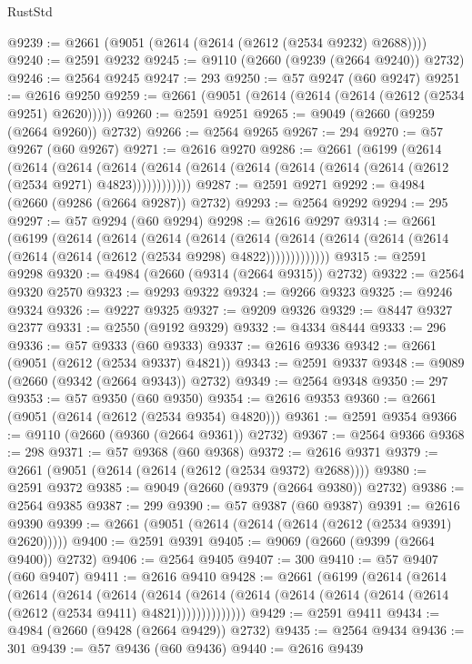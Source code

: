 \begin{lexlean}{RustStd}
\begin{coremodule}
@9239 := @2661 (@9051 (@2614 (@2614 (@2612 (@2534 @9232) @2688))))
@9240 := @2591 @9232
@9245 := @9110 (@2660 (@9239 (@2664 @9240)) @2732)
@9246 := @2564 @9245
@9247 := 293
@9250 := @57 @9247 (@60 @9247)
@9251 := @2616 @9250
@9259 := @2661 (@9051 (@2614 (@2614 (@2614 (@2612 (@2534 @9251) @2620)))))
@9260 := @2591 @9251
@9265 := @9049 (@2660 (@9259 (@2664 @9260)) @2732)
@9266 := @2564 @9265
@9267 := 294
@9270 := @57 @9267 (@60 @9267)
@9271 := @2616 @9270
@9286 := @2661
    (@6199
      (@2614
        (@2614
          (@2614
            (@2614 (@2614 (@2614 (@2614 (@2614 (@2614 (@2614 (@2612 (@2534 @9271) @4823))))))))))))
@9287 := @2591 @9271
@9292 := @4984 (@2660 (@9286 (@2664 @9287)) @2732)
@9293 := @2564 @9292
@9294 := 295
@9297 := @57 @9294 (@60 @9294)
@9298 := @2616 @9297
@9314 := @2661
    (@6199
      (@2614
        (@2614
          (@2614
            (@2614
              (@2614
                (@2614 (@2614 (@2614 (@2614 (@2614 (@2614 (@2612 (@2534 @9298) @4822)))))))))))))
@9315 := @2591 @9298
@9320 := @4984 (@2660 (@9314 (@2664 @9315)) @2732)
@9322 := @2564 @9320 @2570
@9323 := @9293 @9322
@9324 := @9266 @9323
@9325 := @9246 @9324
@9326 := @9227 @9325
@9327 := @9209 @9326
@9329 := @8447 @9327 @2377
@9331 := @2550 (@9192 @9329)
@9332 := @4334 @8444
@9333 := 296
@9336 := @57 @9333 (@60 @9333)
@9337 := @2616 @9336
@9342 := @2661 (@9051 (@2612 (@2534 @9337) @4821))
@9343 := @2591 @9337
@9348 := @9089 (@2660 (@9342 (@2664 @9343)) @2732)
@9349 := @2564 @9348
@9350 := 297
@9353 := @57 @9350 (@60 @9350)
@9354 := @2616 @9353
@9360 := @2661 (@9051 (@2614 (@2612 (@2534 @9354) @4820)))
@9361 := @2591 @9354
@9366 := @9110 (@2660 (@9360 (@2664 @9361)) @2732)
@9367 := @2564 @9366
@9368 := 298
@9371 := @57 @9368 (@60 @9368)
@9372 := @2616 @9371
@9379 := @2661 (@9051 (@2614 (@2614 (@2612 (@2534 @9372) @2688))))
@9380 := @2591 @9372
@9385 := @9049 (@2660 (@9379 (@2664 @9380)) @2732)
@9386 := @2564 @9385
@9387 := 299
@9390 := @57 @9387 (@60 @9387)
@9391 := @2616 @9390
@9399 := @2661 (@9051 (@2614 (@2614 (@2614 (@2612 (@2534 @9391) @2620)))))
@9400 := @2591 @9391
@9405 := @9069 (@2660 (@9399 (@2664 @9400)) @2732)
@9406 := @2564 @9405
@9407 := 300
@9410 := @57 @9407 (@60 @9407)
@9411 := @2616 @9410
@9428 := @2661
    (@6199
      (@2614
        (@2614
          (@2614
            (@2614
              (@2614
                (@2614
                  (@2614 (@2614 (@2614 (@2614 (@2614 (@2614 (@2612 (@2534 @9411) @4821))))))))))))))
@9429 := @2591 @9411
@9434 := @4984 (@2660 (@9428 (@2664 @9429)) @2732)
@9435 := @2564 @9434
@9436 := 301
@9439 := @57 @9436 (@60 @9436)
@9440 := @2616 @9439

\end{coremodule}
\end{lexlean}
